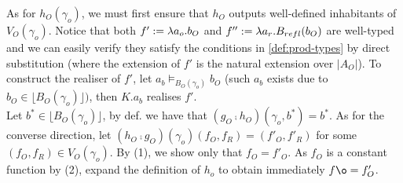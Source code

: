 \documentclass[12pt,a4paper]{article}
\def\rfl{_{refl}}
\renewcommand{\O}{_{O}}\alwaysmath{O}
\newcommand{\R}{\ensuremath{_{R}}}
\begin{document}
As for $h\O(\gamma_o)$, we must first ensure that $h\O$ outputs well-defined inhabitants of $V\O(\gamma_o)$. Notice that both $f' \define \lambda a_o. b\O$ and $f'' \define \lambda a_r. B\rfl(b\O)$ are well-typed and we can easily verify they satisfy the conditions in \cref{def:prod-types} by direct substitution (where the extension of $f'$ is the natural extension over $|A\O|$). To construct the realiser of $f'$, let $a_b \vDash_{B\O(\gamma_o)} b\O$ (such $a_b$ exists due to $b\O \in \lfloor B\O(\gamma_o)\rfloor)$, then $K. a_b$ realises $f'$.\\

Let $b^* \in \lfloor B\O(\gamma_o) \rfloor$, by def. we have that $ (g\O \comp h\O)(\gamma_o, b^*) = b^*$. As for the converse direction, let $(h\O \comp  g\O)(\gamma_o)(f\O, f\R)=(f'\O, f'\R)$ for some $(f\O, f\R) \in V\O(\gamma_o)$. By (1), we show only that $f\O = f'\O$. As $f\O$ is a constant function by (2), expand the definition of $h_o$ to obtain immediately $f\o = f'\O$.

\newpage
%

\begin{center}

\end{center}

\printbibliography
\end{document}
